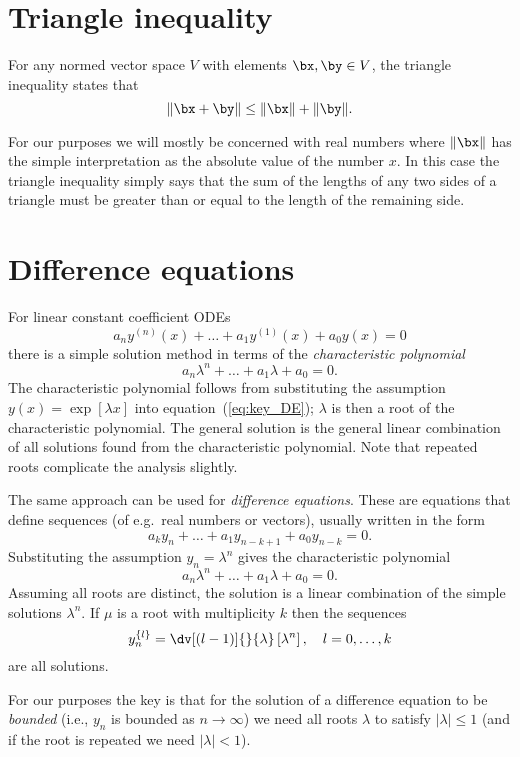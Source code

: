 \section{Triangle inequality}

For any normed vector space $V$ with elements $\bx, \by \in V$, the
triangle inequality states that
%
\begin{equation}
  \label{eq:key_triangle}
  \| \bx + \by \| \leq \| \bx \| + \| \by \|.
\end{equation}

For our purposes we will mostly be concerned with real numbers where
$\| \bx \|$ has the simple interpretation as the absolute value of the
number $x$. In this case the triangle inequality simply says that the
sum of the lengths of any two sides of a triangle must be greater than
or equal to the length of the remaining side.

\section{Difference equations}

For linear constant coefficient ODEs
%
\begin{equation}
  \label{eq:key_DE}
  a_n y^{(n)}(x) + \dots + a_1 y^{(1)}(x) + a_0 y(x) = 0
\end{equation}
%
there is a simple solution method in terms of the \emph{characteristic
polynomial}
%
\begin{equation}
  \label{eq:key_DE2}
  a_n \lambda^n + \dots + a_1 \lambda + a_0 = 0.
\end{equation}
%
The characteristic polynomial follows from substituting the assumption
$y(x) = \exp[\lambda x]$ into equation~(\ref{eq:key_DE}); $\lambda$ is
then a root of the characteristic polynomial. The general solution is
the general linear combination of all solutions found from the
characteristic polynomial. Note that repeated roots complicate the
analysis slightly.

The same approach can be used for \emph{difference equations}. These
are equations that define sequences (of e.g.\ real numbers or
vectors), usually written in the form
%
\begin{equation}
  \label{eq:key_DE3}
  a_k y_n + \dots + a_1 y_{n-k+1} + a_0 y_{n-k} = 0.
\end{equation}
%
Substituting the assumption $y_n = \lambda^n$ gives the characteristic
polynomial
%
\begin{equation}
  \label{eq:key_DE4}
  a_n \lambda^n + \dots + a_1 \lambda + a_0 = 0.
\end{equation}
%
Assuming all roots are distinct, the solution is a linear combination
of the simple solutions $\lambda^n$. If $\mu$ is a root with
multiplicity $k$ then the sequences
%
\begin{equation}
  \label{eq:key_DE5}
  y^{\{l\}}_n = \dv[(l-1)]{}{\lambda} \left[
    \lambda^n \right], \quad l = 0, \dots, k
\end{equation}
%
are all solutions.

For our purposes the key is that for the solution of a difference
equation to be \emph{bounded} (i.e., $y_n$ is bounded as $n \rightarrow
\infty$) we need all roots $\lambda$ to satisfy $|\lambda| \le 1$ (and
if the root is repeated we need $|\lambda| < 1$).
